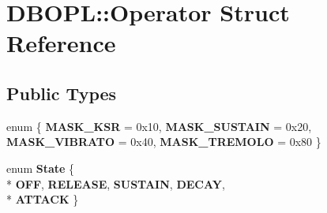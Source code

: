 \hypertarget{structDBOPL_1_1Operator}{\section{D\-B\-O\-P\-L\-:\-:Operator Struct Reference}
\label{structDBOPL_1_1Operator}
}
\subsection*{Public Types}
\begin{DoxyCompactItemize}
\item 
enum \{ {\bfseries M\-A\-S\-K\-\_\-\-K\-S\-R} =  0x10, 
{\bfseries M\-A\-S\-K\-\_\-\-S\-U\-S\-T\-A\-I\-N} =  0x20, 
{\bfseries M\-A\-S\-K\-\_\-\-V\-I\-B\-R\-A\-T\-O} =  0x40, 
{\bfseries M\-A\-S\-K\-\_\-\-T\-R\-E\-M\-O\-L\-O} =  0x80
 \}
\item 
enum {\bfseries State} \{ \\*
{\bfseries O\-F\-F}, 
{\bfseries R\-E\-L\-E\-A\-S\-E}, 
{\bfseries S\-U\-S\-T\-A\-I\-N}, 
{\bfseries D\-E\-C\-A\-Y}, 
\\*
{\bfseries A\-T\-T\-A\-C\-K}
 \}
\end{DoxyCompactItemize}
